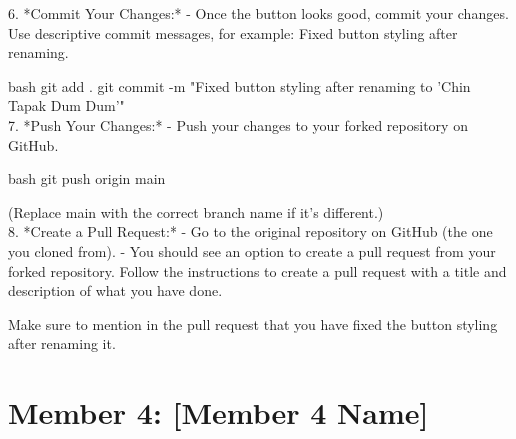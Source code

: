 \documentclass[a4paper,12pt]{article}
\begin{document}
6. *Commit Your Changes:*
   - Once the button looks good, commit your changes. Use descriptive commit messages, for example: Fixed button styling after renaming.

   bash
   git add .
   git commit -m "Fixed button styling after renaming to 'Chin Tapak Dum Dum'"
   \\
   
7. *Push Your Changes:*
   - Push your changes to your forked repository on GitHub.

   bash
   git push origin main
   

   (Replace main with the correct branch name if it's different.)\\
   
8. *Create a Pull Request:*
   - Go to the original repository on GitHub (the one you cloned from).
   - You should see an option to create a pull request from your forked repository. Follow the instructions to create a pull request with a title and description of what you have done.

   Make sure to mention in the pull request that you have fixed the button styling after renaming it.


\newpage

\section*{Member 4: [Member 4 Name]}
\date{\today}
\end{document}
